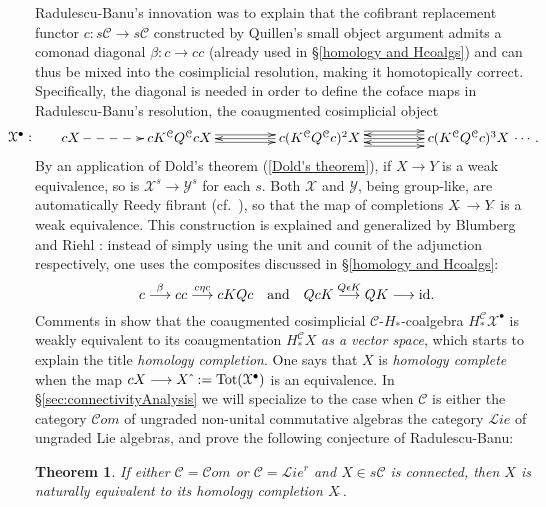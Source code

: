 \documentclass[11pt]{amsart} \renewcommand{\baselinestretch}{1.2}
\theoremstyle{plain}
\newtheorem{thm}{Theorem}[section]
\theoremstyle{definition}
\renewcommand{\to}{\longrightarrow}
\newcommand{\scrL}{\mathscr{L}}
\newcommand{\scrC}{\mathscr{C}}
\newcommand{\calY}{\mathcal{Y}}
\newcommand{\calx}{\mathcal{X}}
\newcommand{\calc}{\mathcal{C}}
\newcommand{\citeBOX}[2][]{\cite[\mbox{#1}]{#2}}
\newcommand{\algs}{{\scrC\!\textit{om}}}
\newcommand{\liealgs}{{\scrL\!\textit{ie}}}
\newcommand{\restliealgs}{{\scrL\!\textit{ie}^\textit{r}}}
\newcommand{\algcat}{{\calc}}%
\begin{document}
\begin{Pi-algebras and cohomology algebras}
Radulescu-Banu's innovation was to explain that the cofibrant replacement functor $c:s\calc\to s\calc$ constructed by Quillen's small object argument \cite{QuillenHomAlg.pdf} admits a comonad diagonal $\beta:c\to cc$  (already used in \S\ref{homology and Hcoalgs}) and can thus be mixed into the cosimplicial resolution, making it homotopically correct. Specifically, the diagonal is needed in order  to define the coface maps in Radulescu-Banu's resolution, the coaugmented cosimplicial object
\[\makebox[0cm][r]{\,$\calx^\bullet:\qquad $}\vcenter{
\def\labelstyle{\scriptstyle}
\xymatrix@C=1.5cm@1{
cX\,
\ar@{-->}[r]
&
\,cK^{\calc}Q^{\calc}cX\,
\ar[r];[]
&
\,c(K^{\calc}Q^{\calc}c)^2X\,
\ar@<-.65ex>[l];[]
\ar@<+.65ex>[l];[]
\ar@<+.65ex>[r];[]
\ar@<-.65ex>[r];[]
&
\,c(K^{\calc}Q^{\calc}c)^3X\,\makebox[0cm][l]{\,$\cdots. $}
\ar[l];[]
\ar@<-1.3ex>[l];[]
\ar@<+1.3ex>[l];[]
}}\]
By an application of Dold's theorem (\ref{Dold's theorem}), if $X\to Y$ is a weak equivalence, so is $\calx^s\to\calY^s$ for each $s$. Both $\calx$ and $\calY$, being group-like,  are automatically Reedy fibrant (cf.\ \citeBOX[{X.4.9}]{YellowMonster}), so that the map of completions $X\hat{\ }\to Y\hat{\ }$ is a weak equivalence.
This construction is explained and generalized by Blumberg and Riehl \citeBOX[\S4]{BlumRiehlResolutions.pdf}: instead of simply using the unit and counit of the adjunction respectively, one uses the composites discussed in \S\ref{homology and Hcoalgs}:
\[c\overset{\beta}{\to}cc\overset{c\eta c}{\to}cKQc\textup{\quad and\quad }QcK\overset{Q\epsilon K}{\to}QK\to \textup{id}.\]
Comments in \citeBOX[\S4]{BlumRiehlResolutions.pdf}  show that the coaugmented cosimplicial $\calc$-$H_*$-coalgebra $H_*^{\calc}\calx^\bullet$  is weakly equivalent to its coaugmentation $H_*^{\calc}X$ \emph{as a vector space}, which starts to explain  the title \emph{homology completion}. One says that $X$ is \emph{homology complete} when the map $cX\to X\hat{\ }:=\textup{Tot}(\calx^\bullet)$ is an equivalence.
In \S\ref{sec:connectivityAnalysis} we will specialize to the case when $\algcat$ is either the category $\algs$  of ungraded non-unital commutative algebras the category $\liealgs$ of ungraded Lie algebras, and prove the following conjecture of Radulescu-Banu:
\begin{thm}
\label{completenesstheorem}
If either $\algcat=\algs$ or $\algcat=\restliealgs$ and $X\in s\algcat$ is connected, then $X$ is naturally equivalent to its homology completion $X\hat{\ }$.
\end{thm}


\end{Pi-algebras and cohomology algebras}
\end{document}
